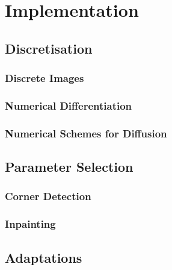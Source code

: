
\chapter{Implementation}

\label{ch:Implementation} 

\section{Discretisation}
\subsection{Discrete Images}
\subsection{Numerical Differentiation}
\subsection{Numerical Schemes for Diffusion}

\section{Parameter Selection}
\subsection{Corner Detection}
\subsection{Inpainting}

\section{Adaptations}
